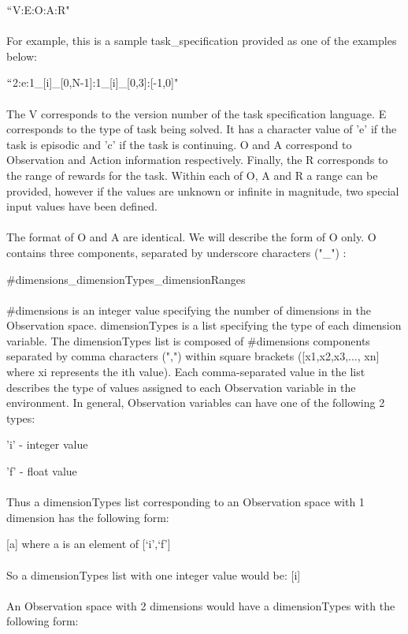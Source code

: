 \documentclass[11pt]{article}
\begin{document}
\hspace{30 pt} $``$V:E:O:A:R"\\\\
For example, this is a sample task\_specification provided as one of the examples below:

\hspace{30 pt}$``$2:e:1\_[i]\_[0,N-1]:1\_[i]\_[0,3]:[-1,0]"\\\\
The V corresponds to the version number of the task specification language. E corresponds to the type of task being solved. It has a character value of 'e' if the task is episodic and 'c' if the task is continuing. O and A correspond to Observation and Action information respectively. Finally, the R corresponds to the range of rewards for the task. Within each of O, A and R a range can be provided, however if the values are unknown or infinite in magnitude, two special input values have been defined.
\\\\
The format of O and A are identical. We will describe the form of O only. O contains three components, separated by underscore characters ("\_") :
        
\hspace{30 pt} \#dimensions\_dimensionTypes\_dimensionRanges
\\\\
\#dimensions is an integer value specifying the number of dimensions in the Observation space. dimensionTypes is a list specifying the type of each dimension variable. The dimensionTypes list is composed of \#dimensions components separated by comma characters (",") within square brackets ([x1,x2,x3,..., xn] where xi  represents the ith value). Each comma-separated value in the list describes the type of values assigned to each Observation variable in the environment. In general, Observation variables can have one of the following 2 types:

\hspace{30 pt} 'i' - integer value

\hspace{30 pt} 'f' - float value
\\\\
Thus a dimensionTypes list corresponding to an Observation space with 1 dimension has the following form:

\hspace{30 pt}[a] where a is an element of [`i',`f']
\\\\
So a dimensionTypes list with one integer value would be:        
\hspace{30 pt} [i]
\\\\
An Observation space with 2 dimensions would have a dimensionTypes with the following form:
\end{document}

